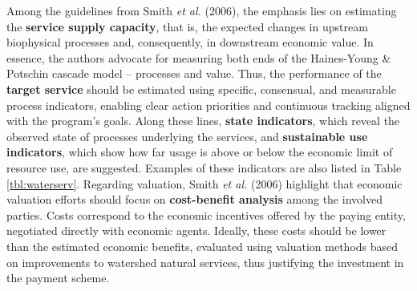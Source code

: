 \documentclass[./main_en.tex]{subfiles}
\begin{document}
\par Among the guidelines from Smith \textit{et al.} (2006), the emphasis lies on estimating the \textbf{service supply capacity}, that is, the expected changes in upstream biophysical processes and, consequently, in downstream economic value. In essence, the authors advocate for measuring both ends of the Haines-Young \& Potschin cascade model -- processes and value. Thus, the performance of the \textbf{target service} should be estimated using specific, consensual, and measurable process indicators, enabling clear action priorities and continuous tracking aligned with the program's goals. Along these lines, \textbf{state indicators}, which reveal the observed state of processes underlying the services, and \textbf{sustainable use indicators}, which show how far usage is above or below the economic limit of resource use, are suggested. Examples of these indicators are also listed in Table \ref{tbl:waterserv}. Regarding valuation, Smith \textit{et al.} (2006) highlight that economic valuation efforts should focus on \textbf{cost-benefit analysis} among the involved parties. Costs correspond to the economic incentives offered by the paying entity, negotiated directly with economic agents. Ideally, these costs should be lower than the estimated economic benefits, evaluated using valuation methods based on improvements to watershed natural services, thus justifying the investment in the payment scheme.
\end{document}
